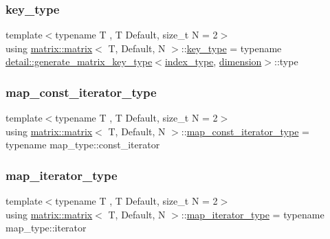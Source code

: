 \subsubsection{\texorpdfstring{key\+\_\+type}{key\_type}}
{\footnotesize\ttfamily template$<$typename T , T Default, size\+\_\+t N = 2$>$ \\
using \hyperlink{structmatrix_1_1matrix}{matrix\+::matrix}$<$ T, Default, N $>$\+::\hyperlink{structmatrix_1_1matrix_af7b5498ac1b615cb9ef51bd185a2557e}{key\+\_\+type} =  typename \hyperlink{classmatrix_1_1detail_1_1generate__matrix__key__type}{detail\+::generate\+\_\+matrix\+\_\+key\+\_\+type}$<$\hyperlink{structmatrix_1_1matrix_a87b61e7f35dcd5991cd3f243cfeced06}{index\+\_\+type}, \hyperlink{structmatrix_1_1matrix_a7d76bd51fd998974f59ea4035e053f74}{dimension}$>$\+::type}

\mbox{\label{structmatrix_1_1matrix_a8d4e1501743e5c63f4dff2e0ae27cf89}} 
\subsubsection{\texorpdfstring{map\+\_\+const\+\_\+iterator\+\_\+type}{map\_const\_iterator\_type}}
{\footnotesize\ttfamily template$<$typename T , T Default, size\+\_\+t N = 2$>$ \\
using \hyperlink{structmatrix_1_1matrix}{matrix\+::matrix}$<$ T, Default, N $>$\+::\hyperlink{structmatrix_1_1matrix_a8d4e1501743e5c63f4dff2e0ae27cf89}{map\+\_\+const\+\_\+iterator\+\_\+type} =  typename map\+\_\+type\+::const\+\_\+iterator}

\mbox{\label{structmatrix_1_1matrix_a718c745a811e13b64ba21239288666a6}} 
\subsubsection{\texorpdfstring{map\+\_\+iterator\+\_\+type}{map\_iterator\_type}}
{\footnotesize\ttfamily template$<$typename T , T Default, size\+\_\+t N = 2$>$ \\
using \hyperlink{structmatrix_1_1matrix}{matrix\+::matrix}$<$ T, Default, N $>$\+::\hyperlink{structmatrix_1_1matrix_a718c745a811e13b64ba21239288666a6}{map\+\_\+iterator\+\_\+type} =  typename map\+\_\+type\+::iterator}

